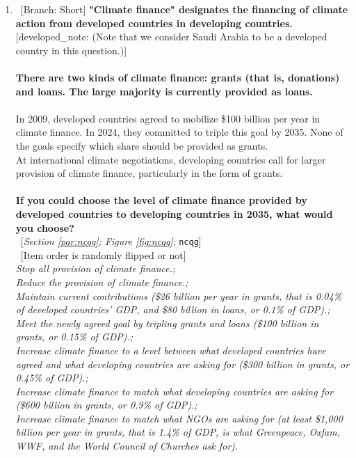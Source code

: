 \begin{enumerate}[resume]
\item ~[Branch: Short] \label{q:ncqg} \textbf{"Climate finance" designates the financing of climate action from developed countries in developing countries.} [developed\_note: (Note that we consider Saudi Arabia to be a developed country in this question.)]\\\\\textbf{There are two kinds of climate finance: grants (that is, donations) and loans. The large majority is currently provided as loans.~}\\\\In 2009, developed countries agreed to mobilize \$100 billion per year in climate finance. In 2024, they committed to triple this goal by 2035. None of the goals specify which share should be provided as grants.~\\At international climate negotiations, developing countries call for larger provision of climate finance, particularly in the form of grants.\\\\\textbf{If you could choose the level of climate finance provided by developed countries to developing countries in 2035, what would you choose?}\\ 
~[\textit{Section \ref{par:ncqg}; Figure \ref{fig:ncqg}}; 
\verb|ncqg|]\\
~[Item order is randomly flipped or not]
  \\ \textit{Stop all provision of climate finance.; \\Reduce the provision of climate finance.; \\Maintain current contributions (\$26 billion per year in grants, that is 0.04\% of developed countries' GDP, and \$80 billion in loans, or 0.1\% of GDP).; \\ Meet the newly agreed goal by tripling grants and loans (\$100 billion in grants, or 0.15\% of GDP).; \\ Increase climate finance to a level between what developed countries have agreed and what developing countries are asking for (\$300 billion in grants, or 0.45\% of GDP).; \\Increase climate finance to match what developing countries are asking for (\$600 billion in grants, or 0.9\% of GDP).; \\Increase climate finance to match what NGOs are asking for (at least \$1,000 billion per year in grants, that is 1.4\% of GDP, is what Greenpeace, Oxfam, WWF, and the World Council of Churches ask for).}

\end{enumerate} 

